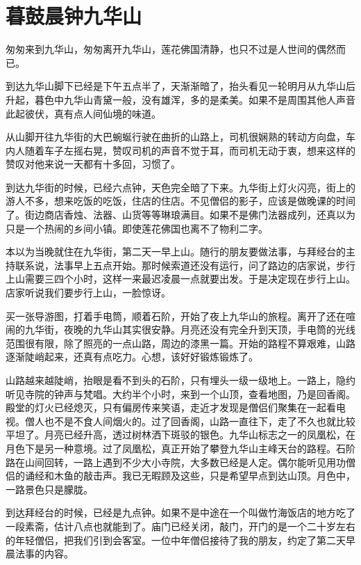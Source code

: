 \section{暮鼓晨钟九华山}

匆匆来到九华山，匆匆离开九华山，莲花佛国清静，也只不过是人世间的偶然而已。

到达九华山脚下已经是下午五点半了，天渐渐暗了，抬头看见一轮明月从九华山后升起，暮色中九华山青黛一般，没有雄浑，多的是柔美。如果不是周围其他人声音此起彼伏，真有点人间仙境的味道。

从山脚开往九华街的大巴蜿蜒行驶在曲折的山路上，司机很娴熟的转动方向盘，车内人随着车子左摇右晃，赞叹司机的声音不觉于耳，而司机无动于衷，想来这样的赞叹对他来说一天都有十多回，习惯了。

到达九华街的时候，已经六点钟，天色完全暗了下来。九华街上灯火闪亮，街上的游人不多，想来吃饭的吃饭，住店的住店。不见僧侣的影子，应该是做晚课的时间了。街边商店香烛、法器、山货等等琳琅满目。如果不是佛门法器成列，还真以为只是一个热闹的乡间小镇。即使莲花佛国也离不了物利二字。

本以为当晚就住在九华街，第二天一早上山。随行的朋友要做法事，与拜经台的主持联系说，法事早上五点开始。那时候索道还没有运行，问了路边的店家说，步行上山需要三四个小时，这样一来最迟凌晨一点就要出发。于是决定现在步行上山。店家听说我们要步行上山，一脸惊讶。

买一张导游图，打着手电筒，顺着石阶，开始了夜上九华山的旅程。离开了还在喧闹的九华街，夜晚的九华山其实很安静。月亮还没有完全升到天顶，手电筒的光线范围很有限，除了照亮的一点山路，周边的漆黑一篇。开始的路程不算艰难，山路逐渐陡峭起来，还真有点吃力。心想，该好好锻炼锻炼了。

山路越来越陡峭，抬眼是看不到头的石阶，只有埋头一级一级地上。一路上，隐约听见寺院的钟声与梵唱。大约半个小时，来到一个山顶，查看地图，乃是回香阁。殿堂的灯火已经熄灭，只有偏房传来笑语，走近才发现是僧侣们聚集在一起看电视。僧人也不是不食人间烟火的。过了回香阁，山路一直往下，走了不久也就比较平坦了。月亮已经升高，透过树林洒下斑驳的银色。九华山标志之一的凤凰松，在月色下是另一种意境。过了凤凰松，真正开始了攀登九华山主峰天台的路程。石阶路在山间回转，一路上遇到不少大小寺院，大多数已经是人定。偶尔能听见用功僧侣的诵经和木鱼的敲击声。我已无暇顾及这些，只是希望早点到达山顶。月色中，一路景色只是朦胧。

到达拜经台的时候，已经是九点钟。如果不是中途在一个叫做竹海饭店的地方吃了一段素斋，估计八点也就能到了。庙门已经关闭，敲门，开门的是一个二十岁左右的年轻僧侣，把我们引到会客室。一位中年僧侣接待了我的朋友，约定了第二天早晨法事的内容。

